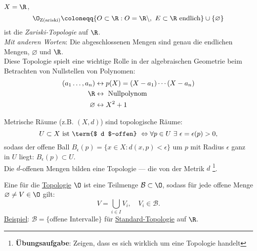 \begin{example}
  \label{bsp:zariskitopologie}
  $ X = \R $,
  \begin{equation*}
    \O_\text{Z(ariski)} \coloneqq \{ O \subset \R : O = \R \setminus, \ E \subset \R \text{ endlich} \} \cup \{ \varnothing \}
  \end{equation*}
  ist die \emph{Zariski-Topologie} auf $ \R $. \\
  \emph{Mit anderen Worten}: Die abgeschlossenen Mengen sind genau die endlichen Mengen, $ \varnothing $ und $ \R $. \\
  Diese Topologie spielt eine wichtige Rolle in der algebraischen Geometrie beim Betrachten von Nullstellen von Polynomen: \\
  \begin{align*}
    (a_1 \dots, a_n) &\leftrightarrow p(X) = (X-a_1)\cdots(X-a_n) \\
     \R &\leftrightarrow \text{ Nullpolynom} \\
     \varnothing &\leftrightarrow X^2+1
  \end{align*}
\end{example}

\begin{definition}
  \label{def:induzierteTopologie}
  Metrische Räume (z.B. $ (X, d) $) sind topologische Räume: \\
  \begin{equation*}
    U \subset X \text{ ist \term{$ d $-offen} } \Leftrightarrow \forall p \in U \ \exists \ \epsilon = \epsilon(p) > 0\text{,}
  \end{equation*}
  sodass der offene Ball $ B_\epsilon(p) = \{ x \in X : d(x,p) < \epsilon \} $ um $ p $ mit Radius $ \epsilon $ ganz in $ U $ liegt: $ B_\epsilon(p) \subset U $. \\
  Die $ d $-offenen Mengen bilden eine Topologie --- die von der Metrik $ d $ \footnote{\textbf{Übungsaufgabe}: Zeigen, dass es sich wirklich um eine Topologie handelt}.
\end{definition}

\begin{definition}[Basis]
  \label{def:basis}
  Eine  für die \hyperref[def:topologie]{Topologie} $ \O $ ist eine Teilmenge $ \mathcal{B} \subset \O $, sodass für jede offene Menge $ \varnothing \neq V \in \O $ gilt:
  \begin{equation*}
    V = \bigcup_{i \in I}V_i, \quad V_i \in \mathcal{B}\text{.}
  \end{equation*}
  \underline{Beispiel}: $ \mathcal{B} = \{ \text{offene Intervalle} \} $ für \hyperref[bsp:standardtopologie]{Standard-Topologie} auf $ \R $.
\end{definition}

